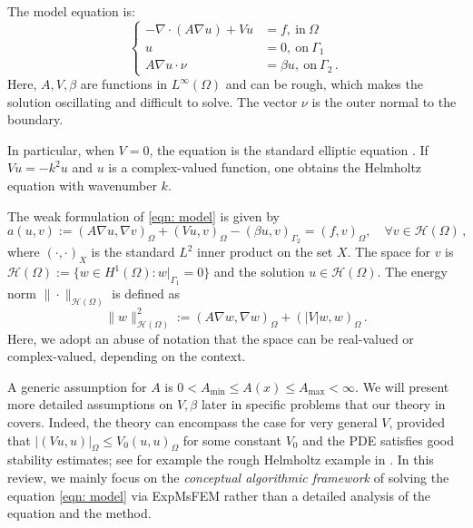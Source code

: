 \documentclass[12pt]{caltech_thesis}
\numberwithin{equation}{section}
\begin{document}
The model equation is: 
\begin{equation}
\label{eqn: model}
\left\{
\begin{aligned}
-\nabla \cdot(A\nabla u)+Vu&=f, \ \text{in} \ \Omega\\
u&=0, \ \text{on} \ \Gamma_1\\
A\nabla u\cdot\nu&=\beta u, \ \text{on} \  \Gamma_2 \, .
\end{aligned}
\right.
\end{equation}
Here, $A, V,\beta$ are functions in $L^{\infty}(\Omega)$ and can be rough, which makes the solution oscillating and difficult to solve. The vector $\nu$ is the outer normal to the boundary. 

In particular, when $V=0$, the equation is the standard elliptic equation \cite{chen2021exponential}. If $Vu=-k^2u$ and $u$ is a complex-valued function, one obtains the Helmholtz equation \cite{chen2023exponentially} with wavenumber $k$. 

The weak formulation of \eqref{eqn: model} is given by
\begin{equation}
\label{eqn: weak form}
a(u, v) :=(A\nabla u, \nabla {v})_{\Omega}+(V u,  {v})_{\Omega}  -( \beta u,  {v})_{\Gamma_2} =( f,  {v})_{\Omega} , \quad \forall v \in \mathcal{H}(\Omega)\, ,
\end{equation}
where $(\cdot,\cdot)_X$ is the standard $L^2$ inner product on the set $X$.
The space for $v$ is $\mathcal{H}(\Omega):=\{w \in H^1(\Omega): w|_{\Gamma_1}=0 \}$ and the solution $u \in \mathcal{H}(\Omega)$. The energy norm $\|\cdot\|_{\mathcal{H}(\Omega)}$ is defined as 
\[\|w\|_{\mathcal{H}(\Omega)}^2:=(A\nabla w, \nabla {w})_{\Omega}+(|V| w,  {w})_{\Omega}\,.\]
Here, we adopt an abuse of notation that the space can be real-valued or complex-valued, depending on the context.


A generic assumption for $A$ is $0<A_{\min}\leq A(x)\leq A_{\max} < \infty$. We will present more detailed assumptions on $V,\beta$ later in specific problems that our theory in \cite{chen2021exponential,chen2023exponentially} covers. 
Indeed, the theory can encompass the case for very general $V$, provided that $|(Vu,u)|_{\Omega}\leq V_0(u,u)_{\Omega}$ for some constant $V_0$ and the PDE satisfies good stability estimates; see for example the rough Helmholtz example in \cite{chen2023exponentially}.
In this review, we mainly focus on the \textit{conceptual algorithmic framework} of solving the equation \eqref{eqn: model} via ExpMsFEM rather than a detailed analysis of the equation and the method.
\end{document}
